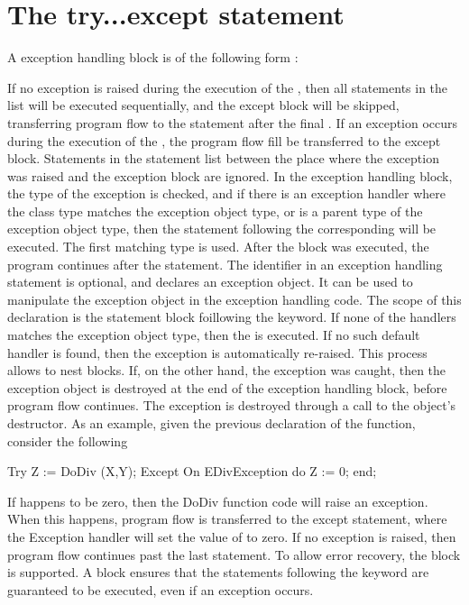 \documentclass{report}
\begin{document}
\section{The try...except statement}
A  exception handling block is of the following form :

If no exception is raised during the execution of the ,
then all statements in the list will be executed sequentially, and the
except block will be skipped, transferring program flow to the statement
after the final .
If an exception occurs during the execution of the , the
program flow fill be transferred to the except block. Statements in the
statement list between the place where the exception was raised and the
exception block are ignored.
In the exception handling block, the type of the exception is checked, 
and if there is an exception handler where the class type matches the 
exception object type, or is a parent type of
the exception object type, then the statement following the corresponding 
 will be executed. The first matching type is used. After the
 block was executed, the program continues after the 
statement.
The identifier in an exception handling statement is optional, and declares 
an exception object. It can be used to manipulate the exception object in 
the exception handling code. The scope of this declaration is the statement 
block foillowing the  keyword.
If none of the  handlers matches the exception object type, then the
 is executed. If no such default handler is 
found, then the exception is automatically re-raised. This process allows
to nest  blocks.
If, on the other hand, the exception was caught, then the exception object is 
destroyed at the end of the exception handling block, before program flow
continues. The exception is destroyed through a call to the object's
 destructor.
As an example, given the previous declaration of the  function,
consider the following
\begin{listing}
Try
  Z := DoDiv (X,Y);
Except
  On EDivException do Z := 0;
end;
\end{listing}
If  happens to be zero, then the DoDiv function code will raise an
exception. When this happens, program flow is transferred to the except
statement, where the Exception handler will set the value of  to
zero. If no exception is raised, then program flow continues past the last
 statement.
To allow error recovery, the  block is supported.
A  block ensures that the statements following the
 keyword are guaranteed to be executed, even if an exception
occurs.
\end{document}
